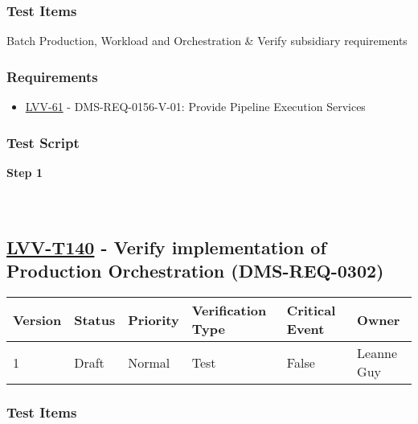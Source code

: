\hypertarget{test-items-115}{%
\subsubsection{Test Items}\label{test-items-115}}

Batch Production, Workload and Orchestration \& Verify subsidiary
requirements

\hypertarget{requirements-116}{%
\subsubsection{Requirements}\label{requirements-116}}

\begin{itemize}
\tightlist
\item
  \href{https://jira.lsstcorp.org/browse/LVV-61}{LVV-61} -
  DMS-REQ-0156-V-01: Provide Pipeline Execution Services
\end{itemize}

\hypertarget{test-script-116}{%
\subsubsection{Test Script}\label{test-script-116}}

\textbf{Step 1}\\
~\\
~\\

\hypertarget{lvv-t140---verify-implementation-of-production-orchestration-dms-req-0302}{%
\subsection{\texorpdfstring{\href{https://jira.lsstcorp.org/secure/Tests.jspa\#/testCase/LVV-T140}{LVV-T140}
- Verify implementation of Production Orchestration
(DMS-REQ-0302)}{LVV-T140 - Verify implementation of Production Orchestration (DMS-REQ-0302)}}\label{lvv-t140---verify-implementation-of-production-orchestration-dms-req-0302}}

\begin{longtable}[]{@{}llllll@{}}
\toprule
Version & Status & Priority & Verification Type & Critical Event &
Owner\tabularnewline
\midrule
\endhead
1 & Draft & Normal & Test & False & Leanne Guy\tabularnewline
\bottomrule
\end{longtable}

\hypertarget{test-items-116}{%
\subsubsection{Test Items}\label{test-items-116}}

